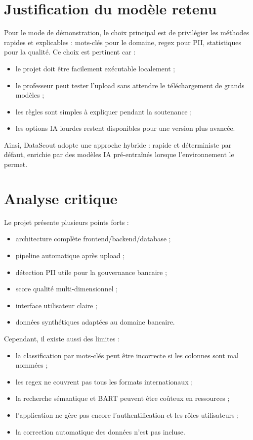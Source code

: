 \documentclass[12pt,a4paper]{report}
\begin{document}
\section{Justification du modèle retenu}

Pour le mode de démonstration, le choix principal est de privilégier les méthodes rapides et explicables : mots-clés pour le domaine, regex pour PII, statistiques pour la qualité. Ce choix est pertinent car :

\begin{itemize}
    \item le projet doit être facilement exécutable localement ;
    \item le professeur peut tester l'upload sans attendre le téléchargement de grands modèles ;
    \item les règles sont simples à expliquer pendant la soutenance ;
    \item les options IA lourdes restent disponibles pour une version plus avancée.
\end{itemize}

Ainsi, DataScout adopte une approche hybride : rapide et déterministe par défaut, enrichie par des modèles IA pré-entraînés lorsque l'environnement le permet.

\section{Analyse critique}

Le projet présente plusieurs points forts :

\begin{itemize}
    \item architecture complète frontend/backend/database ;
    \item pipeline automatique après upload ;
    \item détection PII utile pour la gouvernance bancaire ;
    \item score qualité multi-dimensionnel ;
    \item interface utilisateur claire ;
    \item données synthétiques adaptées au domaine bancaire.
\end{itemize}

Cependant, il existe aussi des limites :

\begin{itemize}
    \item la classification par mots-clés peut être incorrecte si les colonnes sont mal nommées ;
    \item les regex ne couvrent pas tous les formats internationaux ;
    \item la recherche sémantique et BART peuvent être coûteux en ressources ;
    \item l'application ne gère pas encore l'authentification et les rôles utilisateurs ;
    \item la correction automatique des données n'est pas incluse.
\end{itemize}
\end{document}
